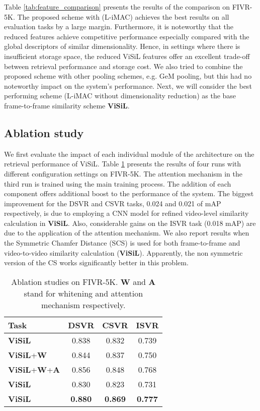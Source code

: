 \documentclass[10pt,twocolumn,letterpaper]{article}
\begin{document}
Table \ref{tab:feature_comparison} presents the results of the comparison on FIVR-5K.  The proposed scheme with  (L-iMAC) achieves the best results on all evaluation tasks by a large margin. Furthermore, it is noteworthy that the reduced features achieve competitive performance especially compared with the global descriptors of similar dimensionality. Hence, in settings where there is insufficient storage space, the reduced ViSiL features offer an excellent trade-off between retrieval performance and storage cost.
We also tried to combine the proposed scheme with other pooling schemes, e.g. GeM pooling, but this had no noteworthy impact on the system's performance. Next, we will consider the best performing scheme (L-iMAC without dimensionality reduction) as the base frame-to-frame similarity scheme \textbf{ViSiL}.

\subsection{Ablation study}
\label{sec:ablation_study}

 We first evaluate the impact of each individual module of the architecture on the retrieval performance of ViSiL. Table \ref{tab:component_impact} presents the results of four runs with different configuration settings on FIVR-5K. The attention mechanism in the third run is trained using the main training process. The addition of each component offers additional boost to the performance of the system. The biggest improvement for the DSVR and CSVR tasks, 0.024 and 0.021 of mAP respectively, is due to employing a CNN model for refined video-level similarity calculation in \textbf{ViSiL}. Also, considerable gains on the ISVR task (0.018 mAP) are due to the application of the attention mechanism.
We also report results when the Symmetric Chamfer Distance (SCS) is used for both frame-to-frame and video-to-video similarity calculation (\textbf{ViSiL}). Apparently, the non symmetric version of the CS works significantly better in this problem.

\begin{table}[h]
  \centering
  \begin{tabular}{|l|c|c|c|}
    \hline
      \textbf{Task}   &   \textbf{DSVR}   &   \textbf{CSVR}   &   \textbf{ISVR}   \\ \hline\hline
      \textbf{ViSiL}  &  0.838   &  0.832   &  0.739  \\ \hline
      \textbf{ViSiL}+\textbf{W}   &  0.844   &  0.837   &  0.750  \\ \hline
      \textbf{ViSiL}+\textbf{W}+\textbf{A} &  0.856   &  0.848   &  0.768 \\ \hline\hline
      \textbf{ViSiL} & 0.830   &  0.823   &  0.731  \\ \hline
      \textbf{ViSiL}  & \textbf{0.880}  &  \textbf{0.869}  &  \textbf{0.777}      \\ \hline
    \end{tabular}
  \caption{Ablation studies on FIVR-5K. \textbf{W} and \textbf{A} stand for whitening and attention mechanism respectively.}
  \label{tab:component_impact}
\end{table}
\end{document}
